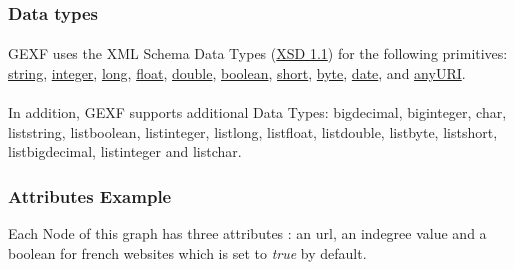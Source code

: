 \documentclass[a4paper,10pt]{article}
\begin{document}
\subsubsection{Data types}

\paragraph{}
GEXF uses the XML Schema Data Types (\href{http://www.w3.org/TR/xmlschema-2/}{XSD 1.1}) for the following primitives: \href{http://www.w3.org/TR/xmlschema-2/#string}{string}, \href{http://www.w3.org/TR/xmlschema-2/#integer}{integer}, \href{http://www.w3.org/TR/xmlschema-2/#long}{long}, \href{http://www.w3.org/TR/xmlschema-2/#float}{float}, \href{http://www.w3.org/TR/xmlschema-2/#double}{double}, \href{http://www.w3.org/TR/xmlschema-2/#boolean}{boolean}, \href{http://www.w3.org/TR/xmlschema-2/#short}{short}, \href{http://www.w3.org/TR/xmlschema-2/#byte}{byte}, \href{http://www.w3.org/TR/xmlschema-2/#date}{date}, and \href{http://www.w3.org/TR/xmlschema-2/#anyURI}{anyURI}.

\paragraph{}
In addition, GEXF supports additional Data Types: bigdecimal, biginteger, char, liststring, listboolean, listinteger, listlong, listfloat, listdouble, listbyte, listshort, listbigdecimal, listinteger and listchar.

\subsubsection{Attributes Example}

Each Node of this graph has three attributes : an url, an indegree value and a boolean for french websites which is set to \textit{true} by default.
\end{document}
